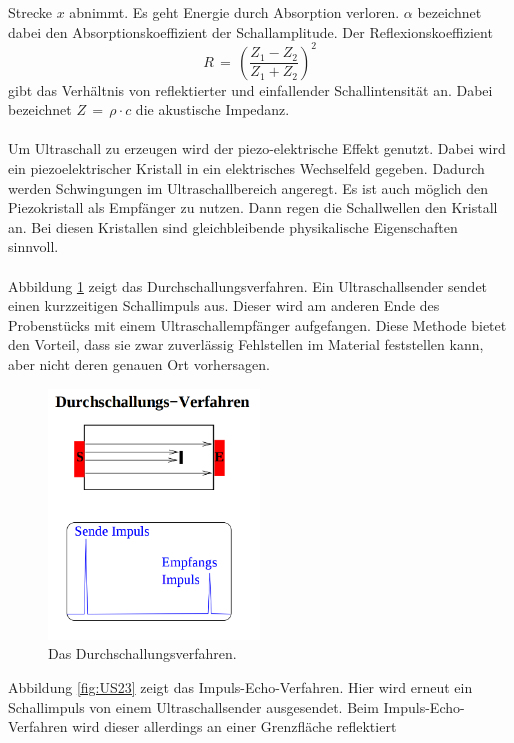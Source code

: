 \documentclass[
  bibliography=totoc,     %
  captions=tableheading,  %
  titlepage=firstiscover, %
]{scrartcl}
\begin{document}
Strecke $x$ abnimmt. Es geht Energie durch Absorption verloren. $\alpha$
bezeichnet dabei den Absorptionskoeffizient der Schallamplitude.
Der Reflexionskoeffizient
\begin{equation}
  R\,=\,\left(\frac{Z_1 - Z_2}{Z_1 + Z_2}\right)^2
  \label{eqn:reflexionskoeffizient}
\end{equation}
gibt das Verhältnis von reflektierter und einfallender Schallintensität an.
Dabei bezeichnet $Z\,=\,\rho \cdot c$ die akustische Impedanz. \\
\\
Um Ultraschall zu erzeugen wird der piezo-elektrische Effekt genutzt. Dabei
wird ein piezoelektrischer Kristall in ein elektrisches Wechselfeld gegeben.
Dadurch werden Schwingungen im Ultraschallbereich angeregt. Es ist auch möglich
den Piezokristall als Empfänger zu nutzen. Dann regen die Schallwellen den
Kristall an. Bei diesen Kristallen sind gleichbleibende physikalische
Eigenschaften sinnvoll. \\
\\
Abbildung \ref{fig:US22} zeigt das Durchschallungsverfahren. Ein
Ultraschallsender sendet einen kurzzeitigen Schallimpuls aus. Dieser wird am
anderen Ende des Probenstücks mit einem Ultraschallempfänger aufgefangen. Diese
Methode bietet den Vorteil, dass sie zwar zuverlässig Fehlstellen im Material
feststellen kann, aber nicht deren genauen Ort vorhersagen.
\begin{figure}[H]
  \centering
  \includegraphics[width=0.5\textwidth]{US22.png}
  \caption{Das Durchschallungsverfahren. \cite{anleitung}}
  \label{fig:US22}
\end{figure}
\noindent
Abbildung \ref{fig:US23} zeigt das Impuls-Echo-Verfahren. Hier wird erneut ein
Schallimpuls von einem Ultraschallsender ausgesendet. Beim
Impuls-Echo-Verfahren wird dieser allerdings an einer Grenzfläche reflektiert
\end{document}
